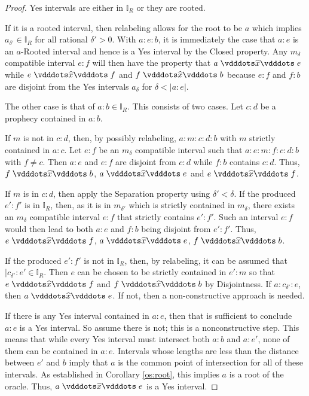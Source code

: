 \documentclass[12pt]{article}
\begin{document}
\begin{proof}
    Yes intervals are either in $\mathbb{I}_R$ or they are rooted. 
    
    If it is a rooted interval, then relabeling allows for the root to be $a$ which implies $a_{\delta'} \in \mathbb{I}_R$ for all rational $\delta' >0$. With $a:e:b$, it is immediately the case that $a:e$ is an $a$-Rooted interval and hence is a Yes interval by the Closed property. Any $m_\delta$ compatible interval $e:f$ will then have the property that $a \xora e$ while \sout{$e\xora f$} and \sout{$f\xora b$} because $e:f$ and $f:b$ are disjoint from the Yes intervals $a_\delta$ for $\delta < |a:e|$.
 
    The other case is that of $a:b \in \mathbb{I}_R$. This consists of two cases. Let $c:d$ be a prophecy contained in $a:b$. 
    
    If $m$ is not in $c:d$, then, by possibly relabeling, $a:m:c:d:b$ with $m$ strictly contained in $a:c$.  Let $e:f$ be an $m_\delta$ compatible interval such that $a:e:m:f:c:d:b$ with $f \neq c$. Then $a:e$ and $e:f$ are disjoint from $c:d$ while $f:b$ contains $c:d$. Thus, $f \xora b$, \sout{$a\xora e$} and \sout{$e\xora f$}.

    If $m$ is in $c:d$, then apply the Separation property using  $\delta' < \delta$. If the produced $e':f'$ is in $\mathbb{I}_R$, then, as it is in $m_{\delta'}$ which is strictly contained in $m_\delta$, there exists an $m_\delta$ compatible interval $e:f$ that strictly contains $e':f'$. Such an interval $e:f$ would then lead to both $a:e$ and $f:b$ being disjoint from $e':f'$. Thus, $e \xora f$, \sout{$a\xora e$}, \sout{$f\xora b$}.

    If the produced $e':f'$ is not in $\mathbb{I}_R$, then, by relabeling, it can be assumed that $|c_{\delta'}:e' \in \mathbb{I}_R$. Then $e$ can be chosen to be strictly contained in $e':m$ so that \sout{$e\xora f$} and \sout{$f\xora b$} by Disjointness. If $a:c_{\delta'}:e$, then $a \xora e$. If not, then a non-constructive approach is needed.

    If there is any Yes interval contained in $a:e$, then that is sufficient to conclude $a:e$ is a Yes interval. So assume there is not; this is a nonconstructive step. This means that while every Yes interval must intersect both $a:b$ and $a:e'$, none of them can be contained in $a:e$. Intervals whose lengths are less than the distance between $e'$ and $b$ imply that $a$ is the common point of intersection for all of these intervals. As established in Corollary \ref{os:root}, this implies $a$ is a root of the oracle. Thus, $a \xora e$ is a Yes interval. 

\end{proof}
\end{document}
